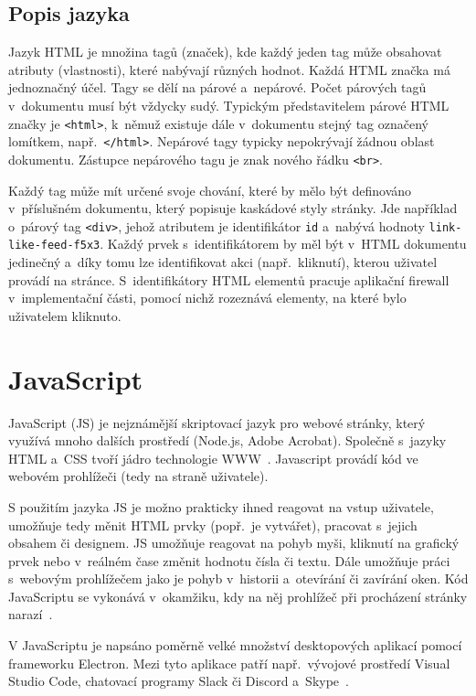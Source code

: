 \subsection*{Popis jazyka}
Jazyk HTML je množina tagů (značek), kde každý jeden tag může obsahovat atributy (vlastnosti), které nabývají různých hodnot. Každá HTML značka má jednoznačný účel. Tagy se dělí na párové a~nepárové. Počet párových tagů v~dokumentu musí být vždycky sudý. Typickým představitelem párové HTML značky je \texttt{<html>}, k~němuž existuje dále v~dokumentu stejný tag označený lomítkem, např.~\texttt{</html>}. Nepárové tagy typicky nepokrývají žádnou oblast dokumentu. Zástupce nepárového tagu je znak nového řádku \texttt{<br>}.

Každý tag může mít určené svoje chování, které by mělo být definováno v~příslušném dokumentu, který popisuje kaskádové styly stránky. Jde například o~párový tag \texttt{<div>}, jehož atributem je identifikátor \texttt{id} a~nabývá hodnoty \texttt{link-like-feed-f5x3}. Každý prvek s~identifikátorem by měl být v~HTML dokumentu jedinečný a~díky tomu lze identifikovat akci (např.~kliknutí), kterou uživatel provádí na stránce. S~identifikátory HTML elementů pracuje aplikační firewall v~implementační části, pomocí nichž rozeznává elementy, na které bylo uživatelem kliknuto.

\section{JavaScript}
\label{sec:java_script}
JavaScript (JS) je nejznámější skriptovací jazyk pro webové stránky, který využívá mnoho dalších prostředí (Node.js, Adobe Acrobat). Společně s~jazyky HTML a~CSS tvoří jádro technologie WWW~\cite{bib:js_html_css}. Javascript provádí kód ve webovém prohlížeči (tedy na straně uživatele).

S použitím jazyka JS je možno prakticky ihned reagovat na vstup uživatele, umožňuje tedy měnit HTML prvky (popř.~je vytvářet), pracovat s~jejich obsahem či designem. JS umožňuje reagovat na pohyb myši, kliknutí na grafický prvek nebo v~reálném čase změnit hodnotu čísla či textu. Dále umožňuje práci s~webovým prohlížečem jako je pohyb v~historii a~otevírání či zavírání oken. Kód JavaScriptu se vykonává v~okamžiku, kdy na něj prohlížeč při procházení stránky narazí~\cite{bib:IIS_JS}.

V JavaScriptu je napsáno poměrně velké množství desktopových aplikací pomocí frameworku Electron. Mezi tyto aplikace patří např.~vývojové prostředí Visual Studio Code, chatovací programy Slack či Discord a~Skype~\cite{bib:electron}.

